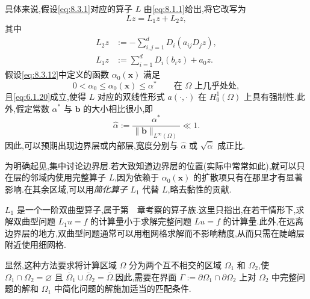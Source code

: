 具体来说,假设\eqref{eq:8.3.1}对应的算子 \(L\) 由\eqref{eq:8.1.1}给出,将它改写为
\[
  Lz=L_1z+L_2z,
\]
其中
\begin{align}
  L_2z&:=-\sum_{i,j=1}^d D_i(a_{ij}D_jz),\label{eq:8.6.1}\\
  L_1z&:=\sum_{i=1}^d D_i(b_iz)+a_0z.\label{eq:8.6.2}
\end{align}
假设\eqref{eq:8.3.12}中定义的函数 \(\alpha_0(\boldsymbol{x})\) 满足
\begin{equation}\label{eq:8.6.3}
  0<\alpha_0\le\alpha_0(\boldsymbol{x})\le\alpha^*
      \qquad\text{在 }\Omega\text{ 上几乎处处},
\end{equation}
且\eqref{eq:6.1.20}成立,使得 \(L\) 对应的双线性形式 \(a(\cdot,\cdot)\) 在 \(H_0^1(\Omega)\) 上具有强制性.此外,假定常数 \(\alpha^*\) 与 \(\boldsymbol{b}\) 的大小相比很小,即
\[
  \widehat\alpha:=\frac{\alpha^*}{\|\boldsymbol{b}\|_{L^\infty(\Omega)}}\ll1.
\]
因此,可以预期出现边界层或内部层,宽度分别与 \(\widehat\alpha\) 或 \(\sqrt{\widehat\alpha}\) 成正比.

为明确起见,集中讨论边界层.若大致知道边界层的位置(实际中常常如此),就可以只在层的邻域内使用完整算子 \(L\),因为依赖于 \(\alpha_0(\boldsymbol{x})\) 的扩散项只有在那里才有显著影响.在其余区域,可以用\emph{简化算子} \(L_1\) 代替 \(L\),略去黏性的贡献.

\(L_1\) 是一个一阶双曲型算子,属于第~~章考察的算子族.这里只指出,在若干情形下,求解双曲型问题 \(L_1u=f\) 的计算量小于求解完整问题 \(Lu=f\) 的计算量.此外,在远离边界层的地方,双曲型问题通常可以用粗网格求解而不影响精度,从而只需在陡峭层附近使用细网格.

显然,这种方法要求将计算区域 \(\Omega\) 分为两个互不相交的区域 \(\Omega_1\) 和 \(\Omega_2\),使 \(\Omega_1\cap\Omega_2=\varnothing\) 且 \(\overline\Omega_1\cup\overline\Omega_2=\overline\Omega\).因此,需要在界面 \(\Gamma:=\partial\Omega_1\cap\partial\Omega_2\) 上对 \(\Omega_2\) 中完整问题的解和 \(\Omega_1\) 中简化问题的解施加适当的匹配条件.

